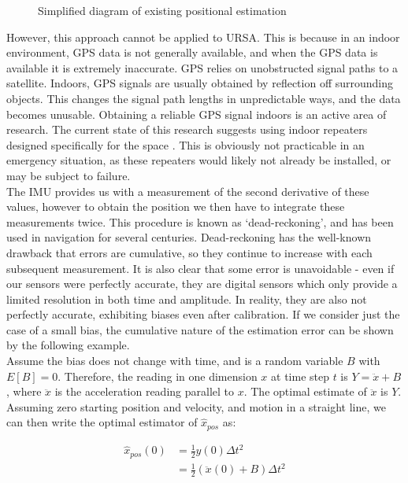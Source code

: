 \documentclass[capstone_report.tex]{subfiles}
\begin{document}
\begin{figure}[H]
	
	\caption{Simplified diagram of existing positional estimation\label{fig:estAlg2}}
\end{figure}

However, this approach cannot be applied to URSA. This is because in an indoor environment, GPS data is not generally available, and when the GPS data is available it is extremely inaccurate. GPS relies on unobstructed signal paths to a satellite. Indoors, GPS signals are usually obtained by reflection off surrounding objects. This changes the signal path lengths in unpredictable ways, and the data becomes unusable. Obtaining a reliable GPS signal indoors is an active area of research. The current state of this research suggests using indoor repeaters designed specifically for the space \cite{ozsoy}. This is obviously not practicable in an emergency situation, as these repeaters would likely not already be installed, or may be subject to failure. \\

The IMU provides us with a measurement of the second derivative of these values, however to obtain the position we then have to integrate these measurements twice. This procedure is known as `dead-reckoning', and has been used in navigation for several centuries. Dead-reckoning has the well-known drawback that errors are cumulative, so they continue to increase with each subsequent measurement. It is also clear that some error is unavoidable - even if our sensors were perfectly accurate, they are digital sensors which only provide a limited resolution in both time and amplitude. In reality, they are also not perfectly accurate, exhibiting biases even after calibration. If we consider just the case of a small bias, the cumulative nature of the estimation error can be shown by the following example.\\ 

Assume the bias does not change with time, and is a random variable $B$ with $E[B]=0$. Therefore, the reading in one dimension $x$ at time step $t$ is $Y=\ddot{x}+B$, where $\ddot{x}$ is the acceleration reading parallel to $x$. The optimal estimate of $\ddot{x}$ is $Y$. Assuming zero starting position and velocity, and motion in a straight line, we can then write the optimal estimator of $\hat{x}_{pos}$ as:

\begin{align*}
	\hat{x}_{pos}(0)&=\frac{1}{2}y(0)\Delta t^2\\
	&=\frac{1}{2}(\ddot{x}(0)+B)\Delta t^2\\
\end{align*}
\end{document}
